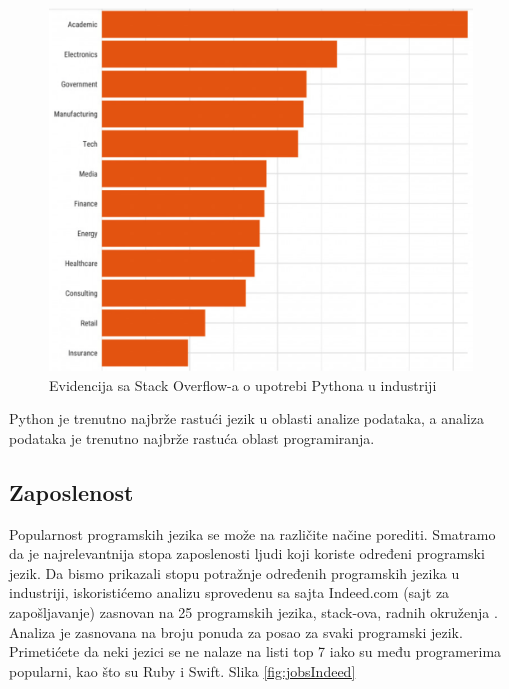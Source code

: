 \documentclass[a4paper]{article}
\begin{document}
\begin{figure}[h!]
\begin{center}
\includegraphics[scale=0.35]{slike/pythonIndustry.png}
\end{center}
\caption{Evidencija sa Stack Overflow-a o upotrebi Pythona u industriji}
\label{fig:PyhtonIndustry}
\end{figure}

Python je trenutno najbrže rastući jezik u oblasti analize podataka, a analiza podataka je trenutno najbrže rastuća oblast programiranja.

\subsection{Zaposlenost}
\label{subsec:zaposlenost}
Popularnost programskih jezika se može na različite načine porediti.
Smatramo da je najrelevantnija stopa zaposlenosti ljudi koji koriste određeni programski jezik. Da bismo prikazali stopu potražnje određenih programskih jezika u industriji, iskoristićemo analizu sprovedenu sa sajta Indeed.com (sajt za zapošljavanje) zasnovan na 25 programskih jezika, stack-ova, radnih okruženja \cite{indeed}.
Analiza je zasnovana na broju ponuda za posao za svaki programski jezik. Primetićete da neki jezici se ne nalaze na listi top 7 iako su među programerima popularni, kao što su Ruby i Swift. Slika \ref{fig:jobsIndeed}
\end{document}

